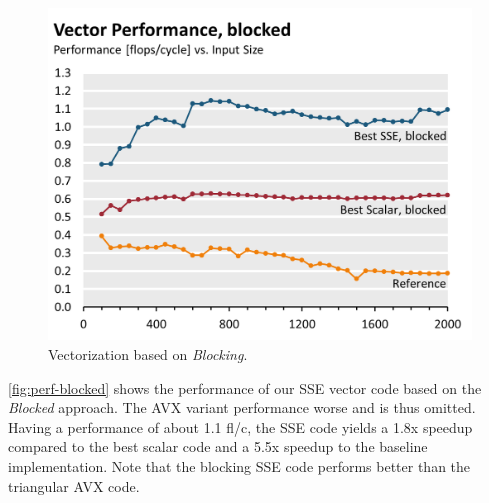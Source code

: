 \begin{figure}\centering
  \includegraphics[width=\linewidth]{plot_data/blocked_vector_performance.png}
  \caption{Vectorization based on \emph{Blocking}.}
  \label{fig:perf-blocked}
\end{figure}
\autoref{fig:perf-blocked} shows the performance of our SSE vector code
based on the \emph{Blocked} approach. The AVX variant performance worse and
is thus omitted. Having a performance of about 1.1 fl/c, the SSE code
yields a 1.8x speedup compared to the best scalar code and a 5.5x speedup
to the baseline implementation. Note that the blocking SSE code performs
better than the triangular AVX code.

